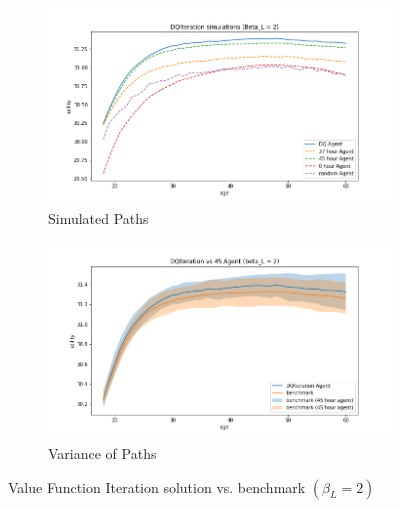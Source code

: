 \begin{figure}[ht]
\begin{subfigure}{.5\textwidth}
  \centering
  \includegraphics[width=1\linewidth]{figures/dqi_model1_beta_2_solution_benchmark_paths.png}
  \caption{Simulated Paths}
  \label{fig:dqi_solution_beta2_path}
\end{subfigure}%
\begin{subfigure}{.5\textwidth}
  \centering
  \includegraphics[width=1\linewidth]{figures/dqi_model1_beta_2_solution_benchmark_variance.png}
  \caption{Variance of Paths}
  \label{fig:dqi_solution_beta2_var}
\end{subfigure}
    \caption{Value Function Iteration solution vs. benchmark $(\beta_L = 2)$}
    \label{fig:dqi_solution_beta2}
\end{figure}

